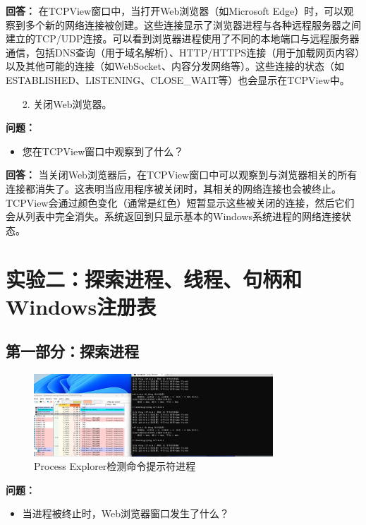 \documentclass[12pt,a4paper]{article}
\begin{document}
\textbf{回答：}
在TCPView窗口中，当打开Web浏览器（如Microsoft Edge）时，可以观察到多个新的网络连接被创建。这些连接显示了浏览器进程与各种远程服务器之间建立的TCP/UDP连接。可以看到浏览器进程使用了不同的本地端口与远程服务器通信，包括DNS查询（用于域名解析）、HTTP/HTTPS连接（用于加载网页内容）以及其他可能的连接（如WebSocket、内容分发网络等）。这些连接的状态（如ESTABLISHED、LISTENING、CLOSE\_WAIT等）也会显示在TCPView中。

\begin{enumerate}
    \item[2.] 关闭Web浏览器。
\end{enumerate}

\textbf{问题：}
\begin{itemize}
    \item 您在TCPView窗口中观察到了什么？
\end{itemize}

\textbf{回答：}
当关闭Web浏览器后，在TCPView窗口中可以观察到与浏览器相关的所有连接都消失了。这表明当应用程序被关闭时，其相关的网络连接也会被终止。TCPView会通过颜色变化（通常是红色）短暂显示这些被关闭的连接，然后它们会从列表中完全消失。系统返回到只显示基本的Windows系统进程的网络连接状态。

\section{实验二：探索进程、线程、句柄和Windows注册表}

\subsection{第一部分：探索进程}

\begin{figure}[H]
    \centering
    \includegraphics[width=0.8\textwidth]{cmd.png}
    \caption{Process Explorer检测命令提示符进程}
    \label{fig:cmd}
\end{figure}

\textbf{问题：}
\begin{itemize}
    \item 当进程被终止时，Web浏览器窗口发生了什么？
\end{itemize}
\end{document}
